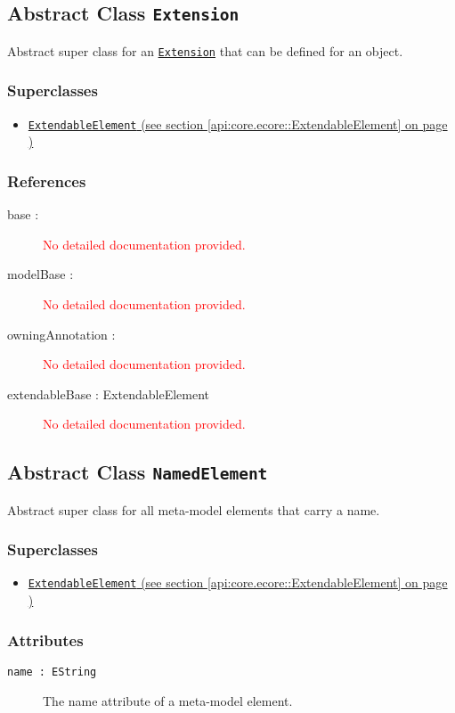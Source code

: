 \subsection{Abstract Class \texttt{Extension}}
\label{api:core.ecore::Extension}
Abstract super class for an \hyperref[Extension]{\texttt{Extension}} that can be defined for an object.
\subsubsection*{Superclasses}
\begin{itemize}
\item \hyperref[api:core.ecore::ExtendableElement]{\texttt{ExtendableElement} (see section \ref*{api:core.ecore::ExtendableElement} on page \pageref*{api:core.ecore::ExtendableElement})}
\end{itemize}
\subsubsection*{References}
\begin{description}
\item[base : ] \textcolor{red}{No detailed documentation provided.}
\item[modelBase : ] \textcolor{red}{No detailed documentation provided.}
\item[owningAnnotation : ] \textcolor{red}{No detailed documentation provided.}
\item[extendableBase : ExtendableElement] \textcolor{red}{No detailed documentation provided.}
\end{description}
\subsection{Abstract Class \texttt{NamedElement}}
\label{api:core.ecore::NamedElement}
Abstract super class for all meta-model elements that carry a name.
\subsubsection*{Superclasses}
\begin{itemize}
\item \hyperref[api:core.ecore::ExtendableElement]{\texttt{ExtendableElement} (see section \ref*{api:core.ecore::ExtendableElement} on page \pageref*{api:core.ecore::ExtendableElement})}
\end{itemize}
\subsubsection*{Attributes}
\begin{description}
\item[\texttt{name~:~EString}] The name attribute of a meta-model element.
\end{description}
